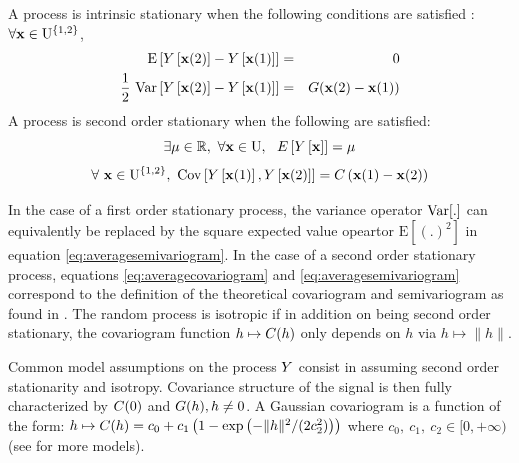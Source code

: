 \begin{definition}
A process is intrinsic stationary when the following conditions are satisfied :  $\forall \mathbf{x}\in\mathrm{U}^{\{1,2\}}$,
\begin{eqnarray}
    \mathrm{E}\left[Y\left[\mathbf{x}(2)\right]-Y\left[\mathbf{x}(1)\right]\right]&=&0\\
    \frac12~\mathrm{Var}\left[Y\left[\mathbf{x}(2)\right]-Y\left[\mathbf{x}(1)\right]\right]&=&G(\mathbf{x}(2)-\mathbf{x}(1))\label{eq:semivariogram}
\end{eqnarray}
A process is second order stationary when the following are satisfied:
\begin{equation}
\exists\mu\in\mathbb{R},~    \forall\mathbf{x}\in \mathrm{U},~~ E\left[Y\left[\mathbf{x}\right]\right]=\mu
\end{equation}
\begin{equation} \label{eq:covariogram}
    \forall~\mathbf{x}\in \mathrm{U}^{\{1,2\}}, ~\mathrm{Cov}\left[Y\left[\mathbf{x}(1)\right],Y\left[\mathbf{x}(2)\right]\right]=C\left(\mathbf{x}(1)-\mathbf{x}(2)\right)
\end{equation}
\end{definition}
In the case of a first order stationary process, the variance operator $\mathrm{Var}[.]$ can equivalently be replaced by the square expected value opeartor $\mathrm{E}[(.)^2]$ in equation \eqref{eq:averagesemivariogram}.
In the case of a second order stationary process, equations \eqref{eq:averagecovariogram} and \eqref{eq:averagesemivariogram} correspond to the definition of the theoretical covariogram and semivariogram as found in \citet[p.~53 and p.~58]{cressie2015statistics}.
The random process is isotropic if in addition on being second order stationary, the covariogram function $h\mapsto C(h)$ only depends on $h$ via $h\mapsto\|h\|$.


Common model assumptions on the process $Y$ consist in assuming second order stationarity and isotropy. Covariance structure of the signal is then fully characterized by $C(0)$ and $G(h), h\neq 0$. 
A Gaussian covariogram is 
a function of the form:
$h\mapsto C(h)=c_0+c_1\left(1-\exp\left(-\|h\|^2/(2c_2^2)\right)\right)$ where $c_0,~c_1,~ c_2\in[0,+\infty)$
(see \cite[p.~80]{chiles1999geostatistics} for more models). 

